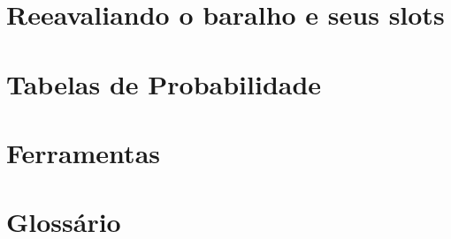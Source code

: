 \documentclass[12pt, a4paper]{article}
\begin{document}
    \section{Reeavaliando o baralho e seus slots}
     \pagebreak

    \section{Tabelas de Probabilidade}
     \pagebreak

    \section{Ferramentas}
     \pagebreak

    \section{Glossário}
     \pagebreak

    
\end{document}
